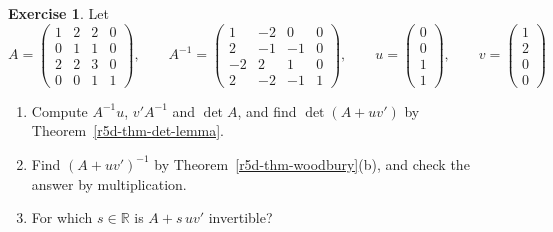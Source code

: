 \documentclass[12pt]{article}
\newcommand{\R}{\mathbb R}
\theoremstyle{definition}
\newtheorem{exercise}{Exercise}
\begin{document}
\begin{exercise}\label{r5d-dr-sherman-morrison}
Let
\[
A=\begin{pmatrix}1&2&2&0\\0&1&1&0\\2&2&3&0\\0&0&1&1\end{pmatrix},\qquad
A^{-1}=\begin{pmatrix}1&-2&0&0\\2&-1&-1&0\\-2&2&1&0\\2&-2&-1&1\end{pmatrix},\qquad
u=\begin{pmatrix}0\\0\\1\\1\end{pmatrix},\qquad v=\begin{pmatrix}1\\2\\0\\0\end{pmatrix}
\]
\begin{enumerate}
\item Compute \(A^{-1}u\), \(v'A^{-1}\) and \(\det A\), and find \(\det(A+uv')\) by Theorem~\ref{r5d-thm-det-lemma}.
\item Find \((A+uv')^{-1}\) by Theorem~\ref{r5d-thm-woodbury}(b), and check the answer by multiplication.
\item For which \(s\in\R\) is \(A+s\,uv'\) invertible?
\end{enumerate}
\end{exercise}
\end{document}

